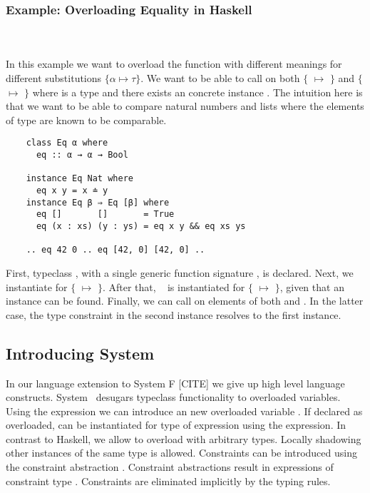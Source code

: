 \subsubsection{Example: Overloading Equality in Haskell}\hfill\\\\
In this example we want to overload the function  with different meanings for different substitutions $\{α \mapsto τ\}$.
We want to be able to call  on both $\{$ $\mapsto$ $\}$ and $\{$ $\mapsto$ \inl{[β]}$\}$ where  is a type and there exists an concrete instance . The intuition here is that we want to be able to compare natural numbers  and lists \mono{[β]} where the elements of type  are known to be comparable.
\begin{verbatim}
    class Eq α where
      eq :: α → α → Bool 

    instance Eq Nat where
      eq x y = x ≐ y
    instance Eq β ⇒ Eq [β] where
      eq []       []       = True
      eq (x : xs) (y : ys) = eq x y && eq xs ys 

    .. eq 42 0 .. eq [42, 0] [42, 0] ..
\end{verbatim}
First, typeclass , with a single generic function signature , is declared. Next, we instantiate  for $\{$ $\mapsto$ $\}$. 
After that, \  is instantiated for $\{$ $\mapsto$ \inl{[β]}$\}$, given that an instance  can be found.
Finally, we can call  on elements of both  and \inl{[Nat]}. In the latter case, the type constraint  in the second instance resolves to the first instance.

\subsection{Introducing System \Fo}
In our language extension to System F [CITE] we give up high level language constructs. 
System \Fo\ desugars typeclass functionality to overloaded variables. 
Using the  expression we can introduce an new overloaded variable . 
If declared as overloaded,  can be instantiated for type  of expression  using the  expression.
In contrast to Haskell, we allow to overload  with arbitrary types. 
Locally shadowing other instances of the same type is allowed.
Constraints can be introduced using the constraint abstraction . Constraint abstractions result in expressions of constraint type . 
Constraints are eliminated implicitly by the typing rules.

